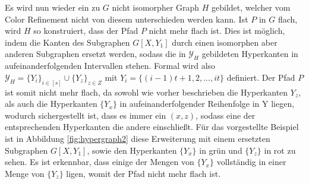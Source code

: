 Es wird nun wieder ein zu $G$ nicht isomorpher Graph $H$ gebildet, welcher vom Color Refinement nicht von diesem unterschieden werden kann.
Ist $P$ in $G$ flach, wird $H$ so konstruiert, dass der Pfad $P$ nicht mehr flach ist.
Dies ist möglich, indem die Kanten des Subgraphen $G[X,Y_1]$ durch einen isomorphen aber anderen Subgraphen ersetzt werden, sodass die in $\mathcal{Y}_H$ gebildeten Hyperkanten in aufeinanderfolgenden Intervallen stehen.
Formal wird also $\mathcal{Y}_H=\{Y_i\}_{i\in [s]}\cup \{Y_z\}_{z\in Z}$ mit $Y_i=\{(i-1)t+1,2,...,it\}$ definiert.
Der Pfad $P$ ist somit nicht mehr flach, da sowohl wie vorher beschrieben die Hyperkanten ${Y_z}$, als auch die Hyperkanten $\{Y_x\}$ in aufeinanderfolgender Reihenfolge in Y liegen, wodurch sichergestellt ist, dass es immer ein $(x,z)$, sodass eine der entsprechenden Hyperkanten die andere einschließt.
Für das vorgestellte Beispiel ist in Abbildung \ref{fig:hypergraph2} diese Erweiterung mit einem ersetzten Subgraphen $G[X,Y_1]$, sowie den Hyperkanten $\{Y_x\}$ in grün und $\{Y_z\}$ in rot zu sehen.
Es ist erkennbar, dass einige der Mengen von $\{Y_x\}$ vollständig in einer Menge von $\{Y_z\}$ ligen, womit der Pfad nicht mehr flach ist.

